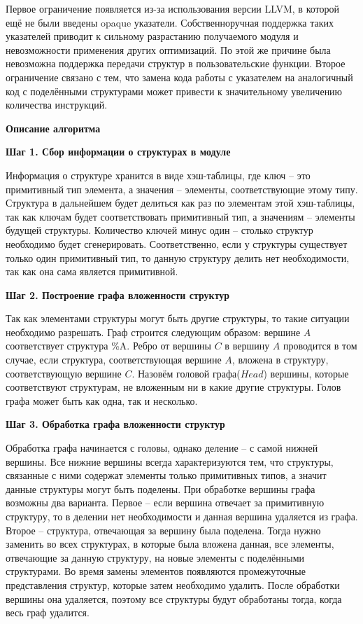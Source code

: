 Первое ограничение появляется из-за использования версии LLVM, в которой ещё не были введены opaque указатели.
Собственноручная поддержка таких указателей приводит к сильному разрастанию получаемого модуля и невозможности применения других оптимизаций.
По этой же причине была невозможна поддержка передачи структур в пользовательские функции.
Второе ограничение связано с тем, что замена кода работы с указателем на аналогичный код с поделёнными структурами может привести к значительному увеличению количества инструкций.

\textbf{Описание алгоритма}

\textbf{Шаг 1. Сбор информации о структурах в модуле}

Информация о структуре хранится в виде хэш-таблицы, где ключ -- это примитивный тип элемента, а значения -- элементы, соответствующие этому типу. Структура в дальнейшем будет делиться как раз по элементам этой хэш-таблицы, так как ключам будет соответствовать примитивный тип, а значениям -- элементы будущей структуры. 
Количество ключей минус один -- столько структур необходимо будет сгенерировать.
Соответственно, если у структуры существует только один примитивный тип, то данную структуру делить нет необходимости, так как она сама является примитивной.

\textbf{Шаг 2. Построение графа вложенности структур}

Так как элементами структуры могут быть другие структуры, то такие ситуации необходимо разрешать.
Граф строится следующим образом: вершине $A$ соответствует структура \%A.
Ребро от вершины $C$ в вершину $A$ проводится в том случае, если структура, соответствующая вершине $A$, вложена в структуру, соответствующую вершине $C$.
Назовём головой графа($Head$) вершины, которые соответствуют структурам, не вложенным ни в какие другие структуры.
Голов графа может быть как одна, так и несколько.

\textbf{Шаг 3. Обработка графа вложенности структур}

Обработка графа начинается с головы, однако деление -- с самой нижней вершины.
Все нижние вершины всегда характеризуются тем, что структуры, связанные с ними содержат элементы только примитивных типов, а значит данные структуры могут быть поделены.
При обработке вершины графа возможны два варианта.
Первое -- если вершина отвечает за примитивную структуру, то в делении нет необходимости и данная вершина удаляется из графа.
Второе -- структура, отвечающая за вершину была поделена.
Тогда нужно заменить во всех структурах, в которые была вложена данная, все элементы, отвечающие за данную структуру, на новые элементы с поделёнными структурами.
Во время замены элементов появляются промежуточные представления структур, которые затем необходимо удалить.
После обработки вершины она удаляется, поэтому все структуры будут обработаны тогда, когда весь граф удалится.

